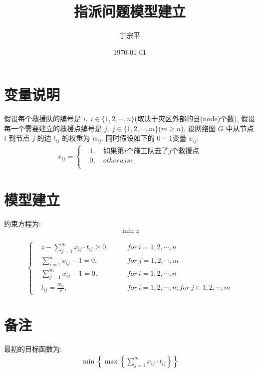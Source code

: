 \documentclass[12pt]{article}
\title{指派问题模型建立}
\author{丁宗平}
\date{\today}
\begin{document}
\maketitle



\section{变量说明}
假设每个救援队的编号是 $i,\; i\in \{1, 2, \cdots, n\}$(取决于灾区外部的县(node)个数), 
假设每一个需要建立的救援点编号是 $j,\; j\in \{1, 2, \cdots, m\}$($m\ge n$).
设网络图 $G$ 中从节点 $i$ 到节点 $j$ 的边 $l_{ij}$ 的权重为 $w_{ij}$.
同时假设如下的 $0-1$变量 $x_{ij}$:
\begin{align}
    x_{ij} = 
    \left\{
        \begin{aligned}
            & 1,\quad 如果第 i 个施工队去了 j 个救援点 \\
            & 0,\quad otherwise \\
        \end{aligned}
    \right.
\end{align}



\section{模型建立}
    约束方程为:
\[
    \min z    
\]

\begin{align}
    \left\{
    \begin{aligned}
        & z - \sum_{j=1}^{m}{x_{ij}\cdot t_{ij}} \ge 0,\quad && for\ i = 1,2,\cdots, n\\
        & \sum_{i=1}^{n}{x_{ij}} - 1 = 0,\quad &&  for\ j = 1,2,\cdots, m\\
        & \sum_{j=1}^{m}{x_{ij}} - 1 = 0,\quad &&  for\ i = 1,2,\cdots, n\\
        & t_{ij} = \frac{w_{ij}}{v},\quad &&  for\ i = 1,2,\cdots, n ;for\ j \in 1, 2, \cdots, m
    \end{aligned}
    \right.
\end{align}

\section{备注}
最初的目标函数为:
\begin{align}
    \min\left\{\max\left\{\sum_{j=1}^{m}{x_{ij}\cdot t_{ij}}\right\}\right\}
\end{align}

\thispagestyle{empty}
\end{document}
